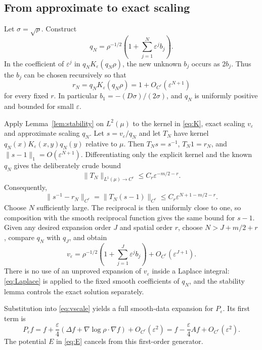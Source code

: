 \documentclass[11pt,a4paper]{article}
\theoremstyle{definition}\newtheorem{definition}[theorem]{Definition}
\theoremstyle{remark}\newtheorem{remark}[theorem]{Remark}
\newcommand{\eps}{\varepsilon}
\newcommand{\norm}[1]{\lVert #1\rVert}
\begin{document}
\subsection{From approximate to exact scaling}
Let $\sigma=\sqrt\rho$. Construct
\[
q_N=\rho^{-1/2}\left(1+\sum_{j=1}^{N}\eps^j b_j\right).
\]
In the coefficient of $\eps^j$ in $q_NK_\eps(q_N\rho)$, the new unknown $b_j$ occurs as $2b_j$. Thus the $b_j$ can be chosen recursively so that
\begin{equation}\label{eq:residual}
r_N=q_NK_\eps(q_N\rho)=1+O_{C^r}(\eps^{N+1})
\end{equation}
for every fixed $r$. In particular $b_1=-(D\sigma)/(2\sigma)$, and $q_N$ is uniformly positive and bounded for small $\eps$.

Apply Lemma~\ref{lem:stability} on $L^2(\mu)$ to the kernel in \eqref{eq:K}, exact scaling $v_\eps$ and approximate scaling $q_N$. Let $s=v_\eps/q_N$ and let $T_N$ have kernel $q_N(x)K_\eps(x,y)q_N(y)$ relative to $\mu$. Then $T_Ns=s^{-1}$, $T_N1=r_N$, and $\norm{s-1}_1=O(\eps^{N+1})$.
Differentiating only the explicit kernel and the known $q_N$ gives the deliberately crude bound
\[
\norm{T_N}_{L^1(\mu)\to C^r}\leq C_r\eps^{-m/2-r}.
\]
Consequently,
\begin{equation}\label{eq:upgrade}
\norm{s^{-1}-r_N}_{C^r}
=\norm{T_N(s-1)}_{C^r}
\leq C_r\eps^{N+1-m/2-r}.
\end{equation}
Choose $N$ sufficiently large. The reciprocal is then uniformly close to one, so composition with the smooth reciprocal function gives the same bound for $s-1$. Given any desired expansion order $J$ and spatial order $r$, choose $N>J+m/2+r$, compare $q_N$ with $q_J$, and obtain
\begin{equation}\label{eq:exactscale}
v_\eps=\rho^{-1/2}\left(1+\sum_{j=1}^{J}\eps^j b_j\right)
+O_{C^r}(\eps^{J+1}).
\end{equation}
There is no use of an unproved expansion of $v_\eps$ inside a Laplace integral: \eqref{eq:Laplace} is applied to the fixed smooth coefficients of $q_N$, and the stability lemma controls the exact solution separately.

Substitution into \eqref{eq:vscale} yields a full smooth-data expansion for $P_\eps$. Its first term is
\begin{equation}\label{eq:generator}
P_\eps f=f+\frac\eps4\left(\Delta f+\nabla\log\rho\cdot\nabla f\right)+O_{C^r}(\eps^2)
=f-\frac\eps4Af+O_{C^r}(\eps^2).
\end{equation}
The potential $E$ in \eqref{eq:E} cancels from this first-order generator.
\end{document}
